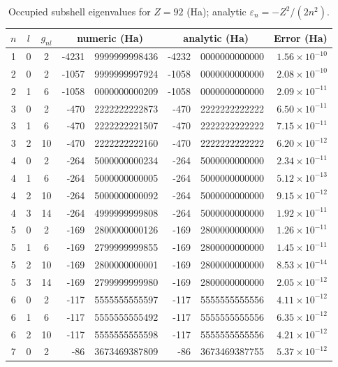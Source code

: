 \begin{table}[!htbp]
    \centering
    \footnotesize
    \setlength{\tabcolsep}{4pt}
    \caption{Occupied subshell eigenvalues for $Z=92$ (Ha); analytic $\varepsilon_n=-Z^2/(2n^2)$.}
    \label{tab:z92-schrodinger-hydrogenic}
    \begin{tabular}{@{}c c c r@{.}l r@{.}l r@{}}
        \toprule
        $n$ & $l$ & $g_{nl}$ & \multicolumn{2}{c}{numeric (Ha)} & \multicolumn{2}{c}{analytic (Ha)} & \multicolumn{1}{c}{Error (Ha)} \\
        \midrule
        1 & 0 & 2  & -4231 & 9999999998436 & -4232 & 0000000000000 & $1.56\times10^{-10}$ \\
        2 & 0 & 2  & -1057 & 9999999997924 & -1058 & 0000000000000 & $2.08\times10^{-10}$ \\
        2 & 1 & 6  & -1058 & 0000000000209 & -1058 & 0000000000000 & $2.09\times10^{-11}$ \\
        3 & 0 & 2  & -470  & 2222222222873 & -470  & 2222222222222 & $6.50\times10^{-11}$ \\
        3 & 1 & 6  & -470  & 2222222221507 & -470  & 2222222222222 & $7.15\times10^{-11}$ \\
        3 & 2 & 10 & -470  & 2222222222160 & -470  & 2222222222222 & $6.20\times10^{-12}$ \\
        4 & 0 & 2  & -264  & 5000000000234 & -264  & 5000000000000 & $2.34\times10^{-11}$ \\
        4 & 1 & 6  & -264  & 5000000000005 & -264  & 5000000000000 & $5.12\times10^{-13}$ \\
        4 & 2 & 10 & -264  & 5000000000092 & -264  & 5000000000000 & $9.15\times10^{-12}$ \\
        4 & 3 & 14 & -264  & 4999999999808 & -264  & 5000000000000 & $1.92\times10^{-11}$ \\
        5 & 0 & 2  & -169  & 2800000000126 & -169  & 2800000000000 & $1.26\times10^{-11}$ \\
        5 & 1 & 6  & -169  & 2799999999855 & -169  & 2800000000000 & $1.45\times10^{-11}$ \\
        5 & 2 & 10 & -169  & 2800000000001 & -169  & 2800000000000 & $8.53\times10^{-14}$ \\
        5 & 3 & 14 & -169  & 2799999999980 & -169  & 2800000000000 & $2.05\times10^{-12}$ \\
        6 & 0 & 2  & -117  & 5555555555597 & -117  & 5555555555556 & $4.11\times10^{-12}$ \\
        6 & 1 & 6  & -117  & 5555555555492 & -117  & 5555555555556 & $6.35\times10^{-12}$ \\
        6 & 2 & 10 & -117  & 5555555555598 & -117  & 5555555555556 & $4.21\times10^{-12}$ \\
        7 & 0 & 2  & -86   & 3673469387809 & -86   & 3673469387755 & $5.37\times10^{-12}$ \\
        \bottomrule
    \end{tabular}
\end{table}
